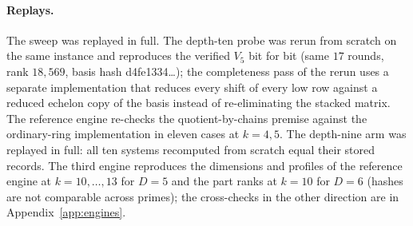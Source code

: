 \documentclass[11pt]{article}
\theoremstyle{definition}\newtheorem{definition}[theorem]{Definition}
\theoremstyle{remark}\newtheorem{remark}[theorem]{Remark}
\newcommand{\codeus}{\textunderscore\allowbreak}
\newcommand{\code}[1]{{\ttfamily\let\_\codeus#1}}
\begin{document}
\paragraph{Replays.} The sweep was replayed in full. The depth-ten probe was
rerun from scratch on the same instance and reproduces the verified $V_5$
bit for bit (same $17$ rounds, rank $18{,}569$, basis hash
\code{d4fe1334\ldots}); the completeness pass of the rerun uses a separate
implementation that reduces every shift of every low row against a reduced
echelon copy of the basis instead of re-eliminating the stacked matrix. The
reference engine re-checks the quotient-by-chains premise against the
ordinary-ring implementation in eleven cases at $k=4,5$. The depth-nine arm
was replayed in full: all ten systems recomputed from scratch equal their
stored records. The third engine reproduces the dimensions and profiles of
the reference engine at $k=10,\ldots,13$ for $D=5$ and the part ranks at
$k=10$ for $D=6$ (hashes are not comparable across primes); the
cross-checks in the other direction are in Appendix~\ref{app:engines}.
\end{document}
